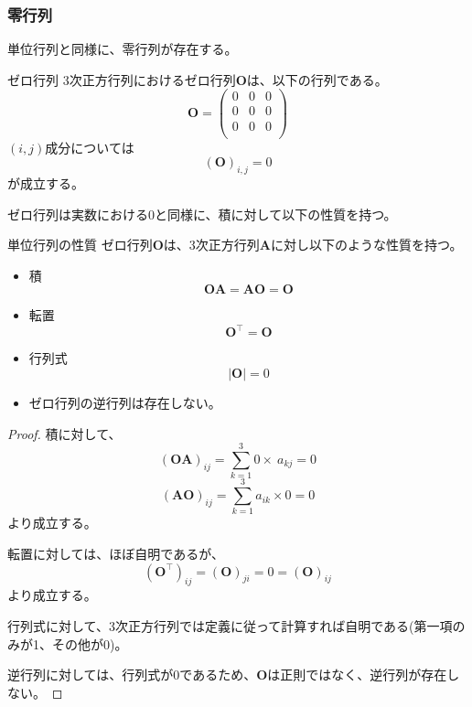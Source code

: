 \subsubsection{零行列}
単位行列と同様に、零行列が存在する。
\begin{definition*}{ゼロ行列}
	3次正方行列におけるゼロ行列\(\boldsymbol{O}\)は、以下の行列である。
	\begin{equation}
		\boldsymbol{O}=
		\begin{pmatrix}
			0 & 0 & 0 \\
			0 & 0 & 0 \\
			0 & 0 & 0 \\
		\end{pmatrix}
	\end{equation}
	\((i,j)\)成分については
	\begin{equation}
		(\boldsymbol{O})_{i,j}=0
	\end{equation}
	が成立する。
\end{definition*}
ゼロ行列は実数における\(0\)と同様に、積に対して以下の性質を持つ。
\begin{theorem*}{単位行列の性質}
	ゼロ行列\(\boldsymbol{O}\)は、3次正方行列\(\boldsymbol{A}\)に対し以下のような性質を持つ。
	\begin{itemize}
		\item 積
		      \begin{equation}
			      \boldsymbol{O}\boldsymbol{A}=\boldsymbol{A}\boldsymbol{O}=\boldsymbol{O}
		      \end{equation}
		\item 転置
		      \begin{equation}
			      \boldsymbol{O}^{\top}=\boldsymbol{O}
		      \end{equation}
		\item 行列式
		      \begin{equation}
			      |\boldsymbol{O}|=0
		      \end{equation}
		\item ゼロ行列の逆行列は存在しない。
	\end{itemize}
\end{theorem*}
\begin{proof}
	積に対して、
	\begin{equation}
		(\boldsymbol{O}\boldsymbol{A})_{ij}=\sum_{k=1}^{3} 0\times \ a_{kj}=0
	\end{equation}
	\begin{equation}
		(\boldsymbol{A}\boldsymbol{O})_{ij}=\sum_{k=1}^{3} a_{ik}\times 0=0
	\end{equation}
	より成立する。

	転置に対しては、ほぼ自明であるが、
	\begin{equation}
		(\boldsymbol{O}^{\top})_{ij}=(\boldsymbol{O})_{ji}=0=(\boldsymbol{O})_{ij}
	\end{equation}
	より成立する。

	行列式に対して、3次正方行列では定義に従って計算すれば自明である(第一項のみが1、その他が0)。

	逆行列に対しては、行列式が0であるため、\(\boldsymbol{O}\)は正則ではなく、逆行列が存在しない。
\end{proof}

